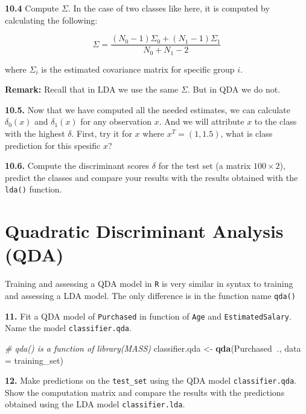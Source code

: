 \documentclass[]{book}
\newenvironment{Shaded}{\begin{snugshade}}{\end{snugshade}}
\newcommand{\KeywordTok}[1]{\textcolor[rgb]{0.13,0.29,0.53}{\textbf{#1}}}
\newcommand{\DataTypeTok}[1]{\textcolor[rgb]{0.13,0.29,0.53}{#1}}
\newcommand{\StringTok}[1]{\textcolor[rgb]{0.31,0.60,0.02}{#1}}
\newcommand{\CommentTok}[1]{\textcolor[rgb]{0.56,0.35,0.01}{\textit{#1}}}
\newcommand{\OperatorTok}[1]{\textcolor[rgb]{0.81,0.36,0.00}{\textbf{#1}}}
\newcommand{\NormalTok}[1]{#1}
\begin{document}
\textbf{10.4} Compute \(\Sigma\). In the case of two classes like here,
it is computed by calculating the following:

\[\Sigma = \frac{(N_0-1)\Sigma_0 + (N_1-1)\Sigma_1}{N_0+N_1-2}\]

where \(\Sigma_i\) is the estimated covariance matrix for specific group
\(i\).

\textbf{Remark:} Recall that in LDA we use the same \(\Sigma\). But in
QDA we do not.

\textbf{10.5.} Now that we have computed all the needed estimates, we
can calculate \(\delta_0(x)\) and \(\delta_1(x)\) for any observation
\(x\). And we will attribute \(x\) to the class with the highest
\(\delta\). First, try it for \(x\) where \(x^T=(1,1.5)\), what is class
prediction for this spesific \(x\)?

\textbf{10.6.} Compute the discriminant scores \(\delta\) for the test
set (a matrix \(100\times 2\)), predict the classes and compare your
results with the results obtained with the \texttt{lda()} function.

\section*{Quadratic Discriminant Analysis
(QDA)}\label{quadratic-discriminant-analysis-qda-1}

Training and assessing a QDA model in \texttt{R} is very similar in
syntax to training and assessing a LDA model. The only difference is in
the function name \texttt{qda()}

\textbf{11.} Fit a QDA model of \texttt{Purchased} in function of
\texttt{Age} and \texttt{EstimatedSalary}. Name the model
\texttt{classifier.qda}.

\begin{Shaded}
\begin{Highlighting}[]
\CommentTok{# qda() is a function of library(MASS)}
\NormalTok{classifier.qda <-}\StringTok{ }\KeywordTok{qda}\NormalTok{(Purchased}\OperatorTok{~}\NormalTok{., }\DataTypeTok{data =}\NormalTok{ training_set)}
\end{Highlighting}
\end{Shaded}

\textbf{12.} Make predictions on the \texttt{test\_set} using the QDA
model \texttt{classifier.qda}. Show the computation matrix and compare
the results with the predictions obtained using the LDA model
\texttt{classifier.lda}.
\end{document}
